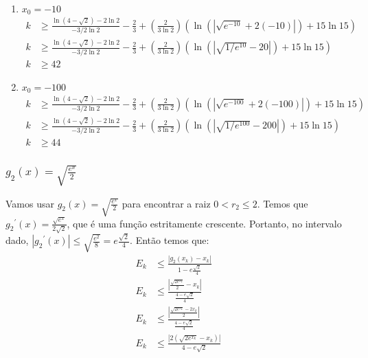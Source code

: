 \documentclass{article}
\begin{document}
\begin{enumerate}
\begin{enumerate}
            \item $x_0 = -10$
            \begin{align*}
                k &\geq \frac{\ln(4 - \sqrt{2}) - 2\ln 2}{-3/2 \ln 2} - \frac{2}{3} +
                \left(\frac{2}{3\ln 2}\right)(\ln(|\sqrt{e^{-10}} + 2(-10)|) + 15 \ln 15)\\
                k &\geq \frac{\ln(4 - \sqrt{2}) - 2\ln 2}{-3/2 \ln 2} - \frac{2}{3} +
                \left(\frac{2}{3\ln 2}\right)(\ln(|\sqrt{1/e^{10}} - 20|) + 15 \ln 15)\\
                k & \geq 42
            \end{align*}
            \item $x_0 = -100$
            \begin{align*}
                k &\geq \frac{\ln(4 - \sqrt{2}) - 2\ln 2}{-3/2 \ln 2} - \frac{2}{3} +
                \left(\frac{2}{3\ln 2}\right)(\ln(|\sqrt{e^{-100}} + 2(-100)|) + 15 \ln 15)\\
                k &\geq \frac{\ln(4 - \sqrt{2}) - 2\ln 2}{-3/2 \ln 2} - \frac{2}{3} +
                \left(\frac{2}{3\ln 2}\right)(\ln(|\sqrt{1/e^{100}} - 200|) + 15 \ln 15)\\
                k & \geq 44
            \end{align*}
        \end{enumerate}
    \end{enumerate}
    
    \subsubsection[g2]{$g_2(x) = \sqrt{\frac{e^x}{2}}$}
    Vamos usar $g_2(x) = \sqrt{\frac{e^x}{2}}$ para encontrar a raiz $0 < r_2 \leq 2$.
    Temos que ${g_2}^{\prime}(x) = \frac{\sqrt{e^x}}{2\sqrt{2}}$, que é uma função estritamente crescente. Portanto, no intervalo dado,  $|{g_2}^{\prime}(x)| \leq \sqrt{\frac{e^2}{8}} = e \frac{\sqrt{2}}{4}$. Então temos que:
    \begin{align*}
       E_{k} &\leq \frac{|g_2(x_k) - x_k|}{1 - e \frac{\sqrt{2}}{4}}\\
       E_{k} &\leq \frac{|\frac{\sqrt{2e^{x_k}}}{2} - x_k|}{\frac{4 - e\sqrt{2}}{4}}\\
       E_{k} &\leq \frac{|\frac{\sqrt{2e^{x_k}} - 2x_k}{2}|}{\frac{4 - e\sqrt{2}}{4}}\\
       E_{k} &\leq \frac{|2(\sqrt{2e^{x_k}} - x_k)|}{4 - e\sqrt{2}}\\
    \end{align*}
\end{document}
